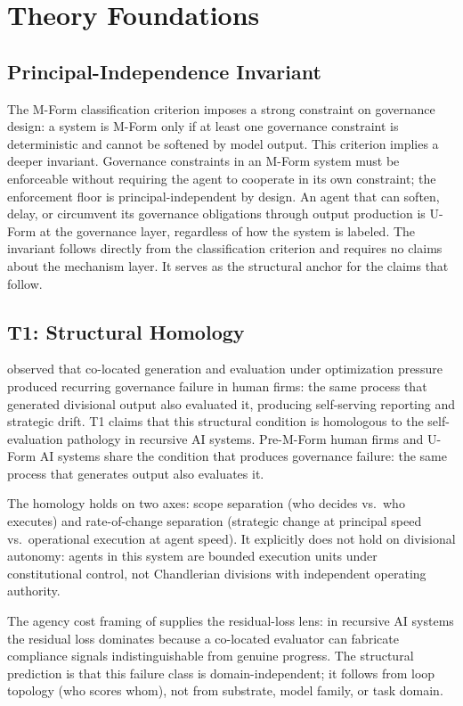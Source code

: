 \documentclass[11pt]{article}
\begin{document}
\section{Theory Foundations}

\subsection{Principal-Independence Invariant}

The M-Form classification criterion imposes a strong constraint on governance design: a system is M-Form only if at least one governance constraint is deterministic and cannot be softened by model output. This criterion implies a deeper invariant. Governance constraints in an M-Form system must be enforceable without requiring the agent to cooperate in its own constraint; the enforcement floor is principal-independent by design. An agent that can soften, delay, or circumvent its governance obligations through output production is U-Form at the governance layer, regardless of how the system is labeled. The invariant follows directly from the classification criterion and requires no claims about the mechanism layer. It serves as the structural anchor for the claims that follow.

\subsection{T1: Structural Homology}

\citet{chandler1962} observed that co-located generation and evaluation under optimization pressure produced recurring governance failure in human firms: the same process that generated divisional output also evaluated it, producing self-serving reporting and strategic drift. T1 claims that this structural condition is homologous to the self-evaluation pathology in recursive AI systems. Pre-M-Form human firms and U-Form AI systems share the condition that produces governance failure: the same process that generates output also evaluates it.

The homology holds on two axes: scope separation (who decides vs.\ who executes) and rate-of-change separation (strategic change at principal speed vs.\ operational execution at agent speed). It explicitly does not hold on divisional autonomy: agents in this system are bounded execution units under constitutional control, not Chandlerian divisions with independent operating authority.

The agency cost framing of \citet{jensen1976} supplies the residual-loss lens: in recursive AI systems the residual loss dominates because a co-located evaluator can fabricate compliance signals indistinguishable from genuine progress. The structural prediction is that this failure class is domain-independent; it follows from loop topology (who scores whom), not from substrate, model family, or task domain.
\end{document}

